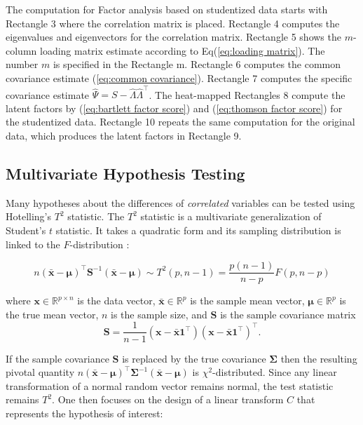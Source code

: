 \documentclass[article]{jss}
\numberwithin{equation}{subsection}
\begin{document}
        The computation for Factor analysis based on studentized data starts with Rectangle 3 where the correlation matrix is placed. Rectangle 4 computes the eigenvalues and eigenvectors for the correlation matrix. Rectangle 5 shows the $m$-column loading matrix estimate according to Eq(\ref{eq:loading matrix}). The number $m$ is specified in the Rectangle m. Rectangle 6 computes the common covariance estimate (\ref{eq:common covariance}). Rectangle 7 computes the specific covariance estimate $\hat{\Psi} = S-\hat{\Lambda}\hat{\Lambda}^\intercal$. The heat-mapped Rectangles 8 compute the latent factors by (\ref{eq:bartlett factor score}) and (\ref{eq:thomson factor score}) for the studentized data. Rectangle 10 repeats the same computation for the original data, which produces the latent factors in Rectangle 9.
        
        \subsection[egOneSample]{Multivariate Hypothesis Testing}
        
        Many hypotheses about the differences of \emph{correlated} variables can be tested using Hotelling's $T^2$ statistic. The $T^2$ statistic is a multivariate generalization of Student's $t$ statistic. It takes a quadratic form and its sampling distribution is linked to the $F$-distribution \citep{hotelling1931Tsq}:
        
        \[n{\left( {\bar{\textbf{x}} - {\boldsymbol{\mu}}} \right)^ \intercal}{\textbf{S}^{ - 1}}\left( {\bar{\textbf{x}} - {\boldsymbol{\mu}}} \right) \sim T^2(p, n-1) = \frac{{p\left( {n - 1} \right)}}{{n - p}}F\left( {p,n - p} \right) \]
        
        where $\textbf{x} \in \mathbb{R}^{p\times n}$ is the data vector, 
        $\bar{\textbf{x}} \in \mathbb{R}^p$ is the sample mean vector, 
        $\boldsymbol{\mu} \in \mathbb{R}^p$ is the true mean vector,
        $n$ is the sample size, and 
        $\textbf{S}$ is the sample covariance matrix
        \[\textbf{S} = \frac{1}{{n - 1}}\left( {\textbf{x} - \bar{\textbf{x}}{\textbf{1}^\intercal}} \right){\left( {\textbf{x} - \bar{\textbf{x}}{\textbf{1}^\intercal}} \right)^\intercal}.\]
        
        
        If the sample covariance $\textbf{S}$ is replaced by the true covariance
        $\boldsymbol{\Sigma}$ then the resulting pivotal quantity $n{\left( {\bar{\textbf{x}} - {\boldsymbol{\mu}}} \right)^ \intercal}{\boldsymbol{\Sigma}^{ - 1}}\left( {\bar{\textbf{x}} - {\boldsymbol{\mu}}} \right)$
        is $\chi^2$-distributed.
        Since any linear transformation of a normal random vector remains normal, the test statistic remains $T^2$. One then focuses on the design of a linear transform $C$ that represents the hypothesis of interest: 
        
\end{document}
